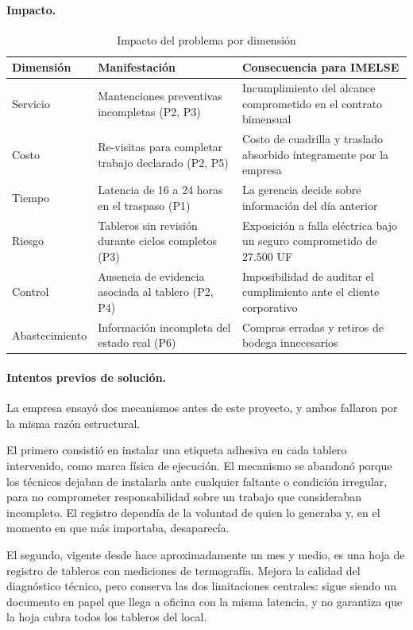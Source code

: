 \documentclass[10pt,letterpaper]{article}
\begin{document}
\paragraph{Impacto.}

\begin{table}[H]
\centering
\small
\begin{tabular}{@{}p{2.6cm}p{6.2cm}p{5.6cm}@{}}
\toprule
\textbf{Dimensión} & \textbf{Manifestación} & \textbf{Consecuencia para IMELSE} \\
\midrule
Servicio & Mantenciones preventivas incompletas (P2, P3) & Incumplimiento del alcance comprometido en el contrato bimensual \\
Costo & Re-visitas para completar trabajo declarado (P2, P5) & Costo de cuadrilla y traslado absorbido íntegramente por la empresa \\
Tiempo & Latencia de 16 a 24 horas en el traspaso (P1) & La gerencia decide sobre información del día anterior \\
Riesgo & Tableros sin revisión durante ciclos completos (P3) & Exposición a falla eléctrica bajo un seguro comprometido de 27.500 UF \\
Control & Ausencia de evidencia asociada al tablero (P2, P4) & Imposibilidad de auditar el cumplimiento ante el cliente corporativo \\
Abastecimiento & Información incompleta del estado real (P6) & Compras erradas y retiros de bodega innecesarios \\
\bottomrule
\end{tabular}
\caption{Impacto del problema por dimensión}
\end{table}

\paragraph{Intentos previos de solución.}
La empresa ensayó dos mecanismos antes de este proyecto, y ambos fallaron por la
misma razón estructural.

El primero consistió en instalar una etiqueta adhesiva en cada tablero intervenido,
como marca física de ejecución. El mecanismo se abandonó porque los técnicos dejaban
de instalarla ante cualquier faltante o condición irregular, para no comprometer
responsabilidad sobre un trabajo que consideraban incompleto. El registro dependía de
la voluntad de quien lo generaba y, en el momento en que más importaba, desaparecía.

El segundo, vigente desde hace aproximadamente un mes y medio, es una hoja de registro
de tableros con mediciones de termografía. Mejora la calidad del diagnóstico técnico,
pero conserva las dos limitaciones centrales: sigue siendo un documento en papel que
llega a oficina con la misma latencia, y no garantiza que la hoja cubra todos los
tableros del local.
\end{document}
